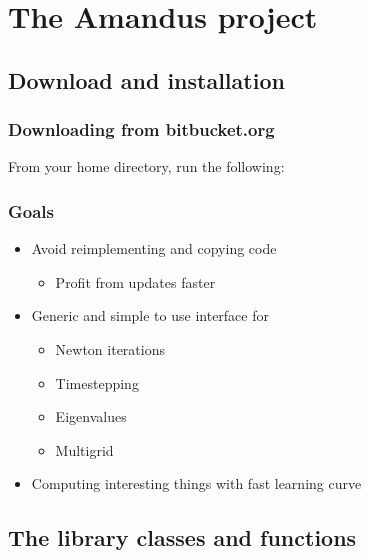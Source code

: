 \section[Amandus]{The Amandus project}
\subsection[Installation]{Download and installation}
\begin{frame}
  \frametitle{Downloading from bitbucket.org}
  From your home directory, run the following:
  \begin{block}{}
    
  \end{block}
\end{frame}

\begin{frame}
  \frametitle{Goals}
  \begin{itemize}
  \item Avoid reimplementing and copying code
    \begin{itemize}
    \item Profit from updates faster
    \end{itemize}
  \item Generic and simple to use interface for
    \begin{itemize}
    \item Newton iterations
    \item Timestepping
    \item Eigenvalues
    \item Multigrid
    \end{itemize}
  \item Computing interesting things with fast learning curve
  \end{itemize}
\end{frame}

\subsection[Library]{The library classes and functions}
\frame{\tableofcontents[currentsection,subsectionstyle=show/shaded/hide]}

